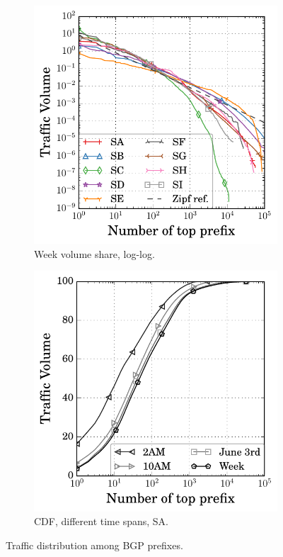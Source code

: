 \begin{figure}[!th]
\centering
        \begin{subfigure}[b]{0.49\textwidth}
				\centering
                \includegraphics[width=\textwidth]{gfx/chap2/loglog_multi_site.pdf}
                \caption{Week volume share, log-log.}
                \label{fig:week_zipf}
        \end{subfigure}  
        \hfill
        \begin{subfigure}[b]{0.49\textwidth}
        		\centering
                \includegraphics[width=\textwidth]{gfx/chap2/cdf_multi_time.pdf}
                \caption{CDF, different time spans, SA.}
                \label{fig:sa_cdf_multi_time}
        \end{subfigure}    
\caption{Traffic distribution among BGP prefixes.}\label{fig:traffic_dis_site}
\end{figure}

